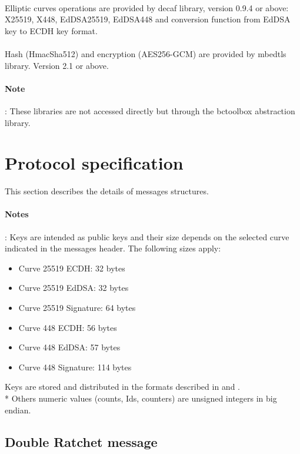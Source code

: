 \documentclass[a4paper,11pt]{article}
\begin{document}
    \paragraph{}Elliptic curves operations are provided by decaf library\cite{libdecaf}, version 0.9.4 or above: X25519, X448, EdDSA25519, EdDSA448 and conversion function from EdDSA key to ECDH key format.
    \paragraph{}Hash (HmacSha512) and encryption (AES256-GCM) are provided by mbedtls library\cite{libmbedtls}. Version 2.1 or above.
    \paragraph{Note}: These libraries are not accessed directly but through the bctoolbox abstraction library.

\newpage
\section{Protocol specification}
  This section describes the details of messages structures.
  \paragraph*{Notes}: Keys are intended as public keys and their size depends on the selected curve indicated in the messages header. The following sizes apply:
  \begin{itemize}
    \item Curve 25519 ECDH: 32 bytes
    \item Curve 25519 EdDSA: 32 bytes
    \item Curve 25519 Signature: 64 bytes
    \item Curve 448 ECDH: 56 bytes
    \item Curve 448 EdDSA: 57 bytes
    \item Curve 448 Signature: 114 bytes
  \end{itemize}
  Keys are stored and distributed in the formats described in \cite{rfc7748} and \cite{rfc8032}.\\*
  Others numeric values (counts, Ids, counters) are unsigned integers in big endian.
  
  \subsection{Double Ratchet message}
\end{document}
